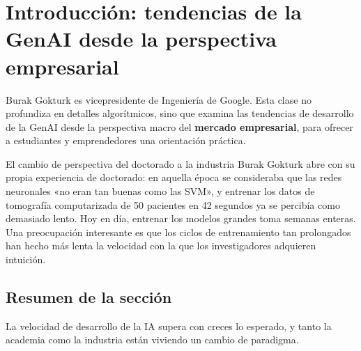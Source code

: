 \section{Introducción: tendencias de la GenAI desde la perspectiva empresarial}

Burak Gokturk es vicepresidente de Ingeniería de Google. Esta clase no profundiza en detalles algorítmicos, sino que examina las tendencias de desarrollo de la GenAI desde la perspectiva macro del \textbf{mercado empresarial}, para ofrecer a estudiantes y emprendedores una orientación práctica.

\begin{knowledgebox}{El cambio de perspectiva del doctorado a la industria}
Burak Gokturk abre con su propia experiencia de doctorado: en aquella época se consideraba que las redes neuronales «no eran tan buenas como las SVM», y entrenar los datos de tomografía computarizada de 50 pacientes en 42 segundos ya se percibía como demasiado lento. Hoy en día, entrenar los modelos grandes toma semanas enteras. Una preocupación interesante es que los ciclos de entrenamiento tan prolongados han hecho más lenta la velocidad con la que los investigadores adquieren intuición.
\end{knowledgebox}

\subsection{Resumen de la sección}

La velocidad de desarrollo de la IA supera con creces lo esperado, y tanto la academia como la industria están viviendo un cambio de paradigma.

